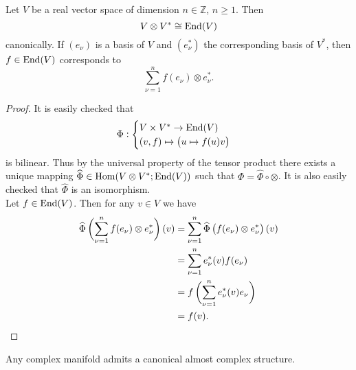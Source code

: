 \begin{lemma}
Let $V$ be a real vector space of dimension $n \in \mathbb{Z}$, $n \geq 1$. Then
\begin{equation}
V \otimes V^* \cong \operatorname{End}(V)
\end{equation}
\noindent canonically. If $(e_\nu)$ is a basis of $V$ and $(e_\nu^*)$ the corresponding basis of $V^*$, then $f \in \operatorname{End}(V)$ corresponds to
\begin{equation}
\sum_{\nu = 1}^n f(e_\nu) \otimes e_\nu^*.
\end{equation}
\label{lem:corr}
\end{lemma}

\begin{proof}
It is easily checked that
\begin{equation*}
\Phi:\begin{cases} 
V \times V^* \to \End(V)\\
(v,f) \mapsto \del[1]{u \mapsto f(u)v}
\end{cases}
\end{equation*}
\noindent is bilinear. Thus by the universal property of the tensor product there exists a unique mapping $\widehat{\Phi} \in \operatorname{Hom}(V \otimes V^*; \operatorname{End}(V))$ such that $\Phi = \widehat{\Phi} \circ \otimes$. It is also easily checked that $\widehat{\Phi}$ is an isomorphism.\\
Let $f \in \operatorname{End}(V)$. Then for any $v \in V$ we have
\begin{align*}
\widehat{\Phi}\del[3]{\sum_{\nu = 1}^n f(e_\nu) \otimes e_\nu^*}(v) &= \sum_{\nu = 1}^n \widehat{\Phi}\del[1]{f(e_\nu) \otimes e_\nu^*}(v)\\
&= \sum_{\nu = 1}^n e_\nu^*(v)f(e_\nu)\\
&= f\del[3]{\sum_{\nu = 1}^n e_\nu^*(v)e_\nu}\\
&= f(v).
\end{align*}
\end{proof}

\begin{proposition}
Any complex manifold admits a canonical almost complex structure.
\label{prop:complex_is_almost}
\end{proposition}

